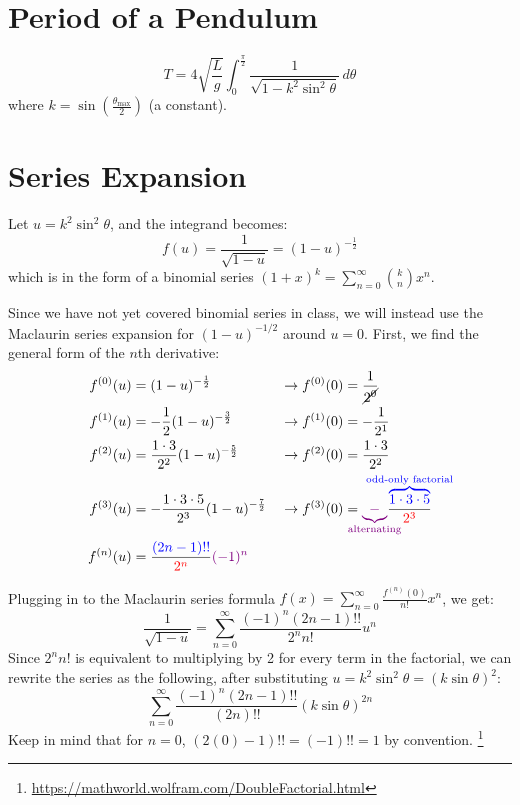 \documentclass[12pt]{article}
\begin{document}
\section{Period of a Pendulum}
\[
  T = 4 \sqrt{\frac{L}{g}} \int_{0}^{\frac{\pi}{2}} \frac{1}{\sqrt{1 - k^2
  \sin^2 \theta}} \, d\theta
\]
where $k = \sin\left(\frac{\theta_{\mathrm{max}}}{2}\right)$ (a constant).

\section{Series Expansion}
Let $u = k^2 \sin^2 \theta$, and the integrand becomes:
\[
  f(u) = \frac{1}{\sqrt{1 - u}} = (1 - u)^{-\frac{1}{2}}
\]
which is in the form of a binomial series $(1+x)^k =
\sum_{n=0}^{\infty} \binom{k}{n} x^n$.

Since we have not yet covered binomial series in class, we will instead
use the Maclaurin series expansion for $(1 - u)^{-1/2}$ around $u =
0$. First, we find the general form of the $n$th derivative:
\begin{align*}
  f^{(0)}(u) &= (1-u)^{-\frac{1}{2}} &&\rightarrow f^{(0)}(0) =
  \frac{1}{\cancel{2^0}} \\
  f^{(1)}(u) &= -\frac{1}{2} (1-u)^{-\frac{3}{2}} &&\rightarrow
  f^{(1)}(0) = -\frac{1}{2^1} \\
  f^{(2)}(u) &= \frac{1\cdot3}{2^2} (1-u)^{-\frac{5}{2}}
  &&\rightarrow f^{(2)}(0) = \frac{1\cdot3}{2^2} \\
  f^{(3)}(u) &= -\frac{1\cdot3\cdot5}{2^3} (1-u)^{-\frac{7}{2}}
  &&\rightarrow f^{(3)}(0) =
  {\color{violet}\underbrace{-}_{\mathclap{\text{alternating}}}}
  \frac{\color{blue}\overbrace{1\cdot3\cdot5}^{\mathclap{\text{odd-only
  factorial}}}}{\color{red}2^3} \\
  f^{(n)}(u) &= \frac{{\color{blue}(2n-1)!!}}{{\color{red}2^n}}
  {\color{violet}(-1)^n}
\end{align*}

Plugging in to the Maclaurin series formula $f(x) =
\sum_{n=0}^{\infty} \frac{f^{(n)}(0)}{n!} x^n$, we get:
\[
  \frac{1}{\sqrt{1 - u}} = \sum_{n=0}^{\infty} \frac{(-1)^n
  (2n-1)!!}{2^n n!} u^n
\]
Since $2^n n!$ is equivalent to multiplying by 2 for every term in
the factorial, we can rewrite the series as the following, after
substituting $u = k^2 \sin^2 \theta = (k\sin\theta)^2$:
\[
  \sum_{n=0}^{\infty} \frac{(-1)^n (2n-1)!!}{(2n)!!}
  {\left(k\sin\theta\right)}^{2n}
\]
Keep in mind that for $n = 0$, $(2(0) - 1)!! = (-1)!! = 1$ by
convention. \footnote{\url{https://mathworld.wolfram.com/DoubleFactorial.html}}
\end{document}
